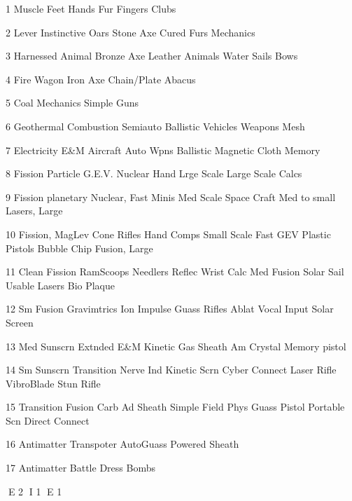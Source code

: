 1		Muscle						Feet		Hands		Fur			Fingers
												Clubs

2		Lever		    Instinctive		Oars		Stone Axe	Cured Furs	
					    Mechanics		

3		Harnessed					Animal		Bronze Axe	Leather		
		Animals						Water Sails	Bows


4		Fire						Wagon		Iron Axe	Chain/Plate	Abacus
												

5		Coal		    Mechanics					Simple Guns				


6		Geothermal					Combustion	Semiauto	Ballistic	 
									Vehicles	Weapons		Mesh


7		Electricity	E&M				Aircraft	Auto Wpns	Ballistic	Magnetic 
															Cloth		Memory


8		Fission 	Particle		G.E.V.		Nuclear 				Hand
		Lrge Scale								Large Scale				Calcs


9		Fission 					planetary	Nuclear,				Fast Minis
		Med Scale					Space Craft	Med to small			
												Lasers,
												Large


10		Fission,					MagLev		Cone Rifles				Hand Comps
		Small Scale					Fast GEV	Plastic Pistols			Bubble Chip
		Fusion, 					
		Large


11		Clean Fission				RamScoops	Needlers		Reflec	Wrist Calc	
		Med Fusion					Solar Sail	Usable Lasers			Bio Plaque


12		Sm Fusion		Gravimtrics	Ion Impulse	Guass Rifles	Ablat	Vocal Input
		Solar Screen				


13		Med Sunscrn		Extnded E&M				Kinetic Gas		Sheath Am	Crystal Memory		 							
												pistol


14		Sm Sunscrn					Transition	Nerve Ind		Kinetic Scrn	Cyber Connect
												Laser Rifle	
												VibroBlade
												Stun Rifle	

15						Transition 				Fusion Carb		Ad Sheath		Simple
						Field Phys				Guass Pistol	Portable Scn	Direct Connect


16		Antimatter					Transpoter	AutoGuass		Powered			
																Sheath
  
	

17												Antimatter 		Battle Dress
												Bombs



E 2
I 1
E 1
